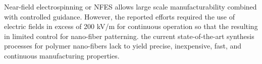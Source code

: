 Near-field electrospinning or NFES allows large scale manufacturability combined with controlled guidance. \cite{Madou2011} However, the reported efforts required the use of electric fields in excess of 200 kV/m for continuous operation so that the resulting in limited control for nano-fiber patterning. \cite{Madou2011} the current state-of-the-art synthesis processes for polymer nano-fibers lack to yield precise, inexpensive, fast, and continuous manufacturing properties.






